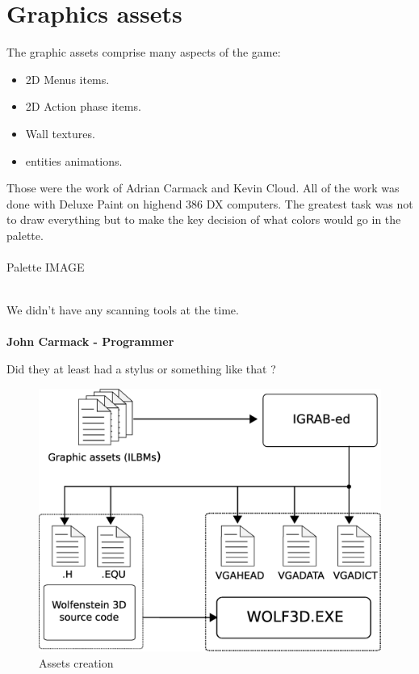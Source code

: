 \documentclass[book.tex]{subfiles}
\begin{document}
\section{Graphics assets}
The graphic assets comprise many aspects of the game:
\begin{itemize}
\item 2D Menus items.
\item 2D Action phase items.
\item Wall textures.
\item entities animations.
\end{itemize}
Those were the work of Adrian Carmack and Kevin Cloud. All of the work was done with Deluxe Paint on highend 386 DX computers. The greatest task was not to draw everything but to make the key decision of what colors would go in the palette.\\
\\
Palette IMAGE\\
\\
\begin{fancyquotes}
We didn't have any scanning tools at the time.\\
\\
\textbf{John Carmack - Programmer}
\end{fancyquotes}
Did they at least had a stylus or something like that ?	\\
\begin{figure}[H]
\centering
 \includegraphics[scale=0.4]{imgs/drawing_plain.eps}
 \caption{Assets creation} \label{fig:mips}
 \end{figure}
\end{document}
